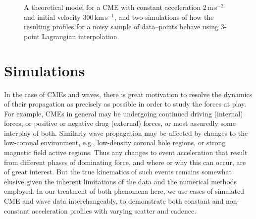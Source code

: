 \documentclass[structabstract]{aa}
\begin{document}
\begin{figure}
\caption{A theoretical model for a CME with constant acceleration 2\,m\,s$^{-2}$ and initial velocity 300\,km\,s$^{-1}$, and two simulations of how the resulting profiles for a noisy sample of data--points behave using 3-point Lagrangian interpolation.}
\label{sim_vels_thesis}
\end{figure}

\section{Simulations}
\label{sect:simul1}

In the case of CMEs and waves, there is great motivation to resolve the dynamics of their propagation as precisely as possible in order to study the forces at play. For example, CMEs in general may be undergoing continued driving (internal) forces, or positive or negative drag (external) forces, or most assuredly some interplay of both. Similarly wave propagation may be affected by changes to the low-coronal environment, e.g., low-density coronal hole regions, or strong magnetic field active regions. Thus any changes to event acceleration that result from different phases of dominating force, and where or why this can occur, are of great interest. But the true kinematics of such events remains somewhat elusive given the inherent limitations of the data and the numerical methods employed. In our treatment of both phenomena here, we use cases of simulated CME and wave data interchangeably, to demonstrate both constant and non-constant acceleration profiles with varying scatter and cadence.
\end{document}
